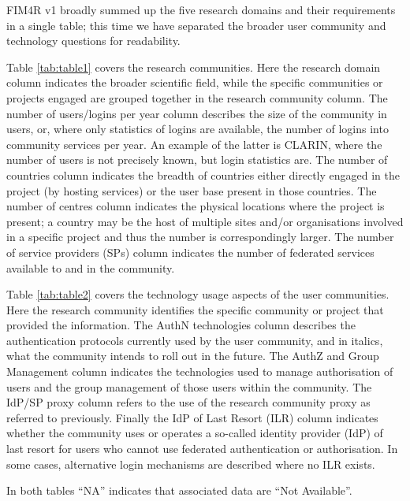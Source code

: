 \documentclass[fleqn,10pt]{wlscirep}
\begin{document}
{FIM4R v1 broadly summed up the five research domains and their requirements in a single table; this time we have separated the broader user community and technology questions for readability.

Table \ref{tab:table1} covers the research communities. Here the research domain column indicates the broader scientific field, while the specific communities or projects engaged are grouped together in the research community column. The number of users/logins per year column describes the size of the community in users, or, where only statistics of logins are available, the number of logins into community services per year. An example of the latter is CLARIN, where the number of users is not precisely known, but login statistics are. The number of countries column indicates the breadth of countries either directly engaged in the project (by hosting services) or the user base present in those countries. The number of centres column indicates the physical locations where the project is present; a country may be the host of multiple sites and/or organisations involved in a specific project and thus the number is correspondingly larger. The number of service providers (SPs) column indicates the number of federated services available to and in the community.

Table \ref{tab:table2} covers the technology usage aspects of the user communities. Here the research community identifies the specific community or project that provided the information. The AuthN technologies column describes the authentication protocols currently used by the user community, and in italics, what the community intends to roll out in the future. The AuthZ and Group Management column indicates the technologies used to manage authorisation of users and the group management of those users within the community. The IdP/SP proxy column refers to the use of the research community proxy as referred to previously. Finally the IdP of Last Resort (ILR) column indicates whether the community uses or operates a so-called identity provider (IdP) of last resort for users who cannot use federated authentication or authorisation. In some cases, alternative login mechanisms are described where no ILR exists.

In both tables “NA” indicates that associated data are “Not Available”.

}
\end{document}
